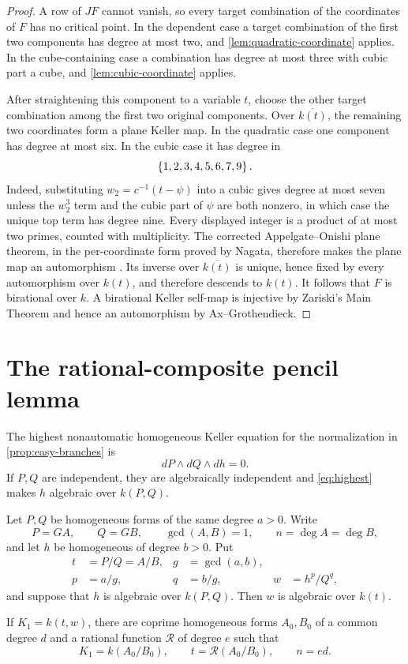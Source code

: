 \documentclass[11pt,reqno]{amsart}
\begin{document}
\begin{proof}
A row of \(JF\) cannot vanish, so every target combination of the
coordinates of \(F\) has no critical point.  In the dependent case a target
combination of the first two components has degree at most two, and
\cref{lem:quadratic-coordinate} applies.  In the cube-containing case a
combination has degree at most three with cubic part a cube, and
\cref{lem:cubic-coordinate} applies.

After straightening this component to a variable \(t\), choose the other
target combination among the first two original components.  Over
\(\overline{k(t)}\), the remaining two coordinates form a plane Keller map.
In the quadratic case one component has degree at most six.  In the cubic
case it has degree in
\[
\left\{1,2,3,4,5,6,7,9\right\}.
\]
Indeed, substituting \(w_2=c^{-1}(t-\psi)\) into a cubic gives degree at most
seven unless the \(w_2^3\) term and the cubic part of \(\psi\) are both
nonzero, in which case the unique top term has degree nine.  Every displayed
integer is a product of at most two primes, counted with multiplicity.
The corrected Appelgate--Onishi plane theorem, in the per-coordinate form
proved by Nagata, therefore makes the plane map an automorphism
\cite{appelgateOnishi1985}\cite[Theorem~7.3]{nagata1988two}.  Its inverse over
\(\overline{k(t)}\) is unique, hence fixed by every automorphism over
\(k(t)\), and therefore descends to \(k(t)\).  It follows that \(F\) is
birational over \(k\).  A birational Keller self-map is injective by
Zariski's Main Theorem and hence an automorphism by Ax--Grothendieck.
\end{proof}

\section{The rational-composite pencil lemma}
\label{sec:pencil}

The highest nonautomatic homogeneous Keller equation for the normalization
in \cref{prop:easy-branches} is
\begin{equation}
\label{eq:highest}
dP\wedge dQ\wedge dh=0.
\end{equation}
If \(P,Q\) are independent, they are algebraically independent and
\eqref{eq:highest} makes \(h\) algebraic over \(k(P,Q)\).

\begin{lemma}
\label{lem:weighted-field}
Let \(P,Q\) be homogeneous forms of the same degree \(a>0\).  Write
\[
P=GA,\qquad Q=GB,\qquad \gcd(A,B)=1,
\qquad n=\deg A=\deg B,
\]
and let \(h\) be homogeneous of degree \(b>0\).  Put
\[
  \begin{aligned}
  t&=P/Q=A/B, & g&=\gcd(a,b),\\
  p&=a/g, & q&=b/g, & w&=h^p/Q^q,
  \end{aligned}
\]
and suppose that \(h\) is algebraic over \(k(P,Q)\).  Then \(w\) is
algebraic over \(k(t)\).

If \(K_1=k(t,w)\), there are coprime homogeneous forms \(A_0,B_0\) of a
common degree \(d\) and a rational function \(\mathcal R\) of degree \(e\)
such that
\[
K_1=k(A_0/B_0),\qquad t=\mathcal R(A_0/B_0),
\qquad n=ed.
\]
\end{lemma}
\end{document}

